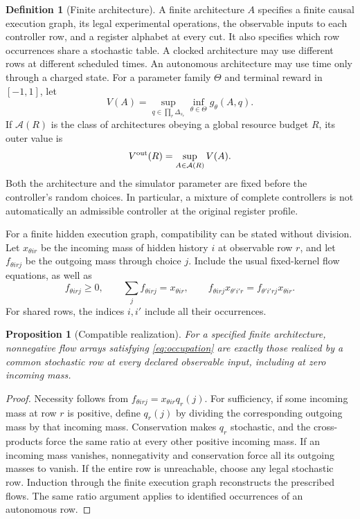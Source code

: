 \documentclass[11pt]{amsart}
\newtheorem{proposition}[theorem]{Proposition}
\theoremstyle{definition}\newtheorem{definition}[theorem]{Definition}
\theoremstyle{remark}\newtheorem{remark}[theorem]{Remark}
\newcommand{\1}{\mathbf 1}
\newcommand{\cA}{\mathcal A}
\begin{document}
\begin{definition}[Finite architecture]
A finite architecture $A$ specifies a finite causal execution graph, its
legal experimental operations, the observable inputs to each controller
row, and a register alphabet at every cut. It also specifies which row
occurrences share a stochastic table. A clocked architecture may use
different rows at different scheduled times. An autonomous architecture
may use time only through a charged state. For a parameter family $\Theta$
and terminal reward in $[-1,1]$, let
\[
 V(A)=\sup_{q\in\prod_r\Delta_{s_r}}\inf_{\theta\in\Theta}
          g_\theta(A,q).
\]
If $\cA(R)$ is the class of architectures obeying a global resource budget
$R$, its outer value is
\[
 V^{\rm out}(R)=\sup_{A\in\cA(R)}V(A).
\]
Both the architecture and the simulator parameter are fixed before the
controller's random choices. In particular, a mixture of complete
controllers is not automatically an admissible controller at the original
register profile.
\end{definition}

For a finite hidden execution graph, compatibility can be stated without
division. Let $x_{\theta i r}$ be the incoming mass of hidden history $i$
at observable row $r$, and let $f_{\theta i r j}$ be the outgoing mass
through choice $j$. Include the usual fixed-kernel flow equations, as
well as
\begin{equation}\label{eq:occupation}
 f_{\theta i r j}\ge0,\qquad
 \sum_jf_{\theta i r j}=x_{\theta i r},\qquad
 f_{\theta i r j}x_{\theta'i'r}
 =f_{\theta'i'rj}x_{\theta i r}.
\end{equation}
For shared rows, the indices $i,i'$ include all their occurrences.

\begin{proposition}[Compatible realization]\label{prop:realization}
For a specified finite architecture, nonnegative flow arrays satisfying
\eqref{eq:occupation} are exactly those realized by a common stochastic
row at every declared observable input, including at zero incoming mass.
\end{proposition}
\begin{proof}
Necessity follows from $f_{\theta i rj}=x_{\theta i r}q_r(j)$.
For sufficiency, if some incoming mass at row $r$ is positive, define
$q_r(j)$ by dividing the corresponding outgoing mass by that incoming
mass. Conservation makes $q_r$ stochastic, and the cross-products force
the same ratio at every other positive incoming mass. If an incoming
mass vanishes, nonnegativity and conservation force all its outgoing
masses to vanish. If the entire row is unreachable, choose any legal
stochastic row. Induction through the finite execution graph reconstructs
the prescribed flows. The same ratio argument applies to identified
occurrences of an autonomous row.
\end{proof}
\end{document}
